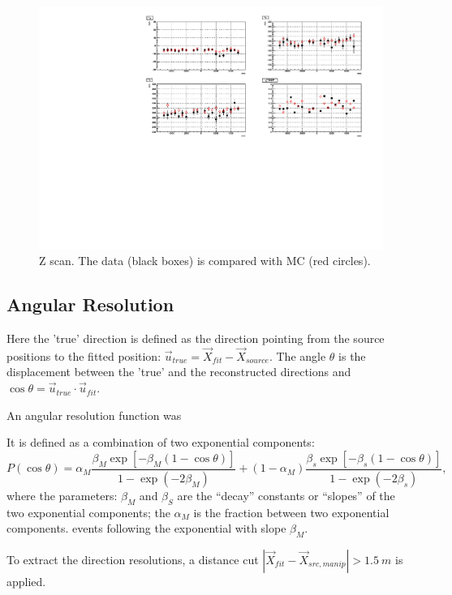 \begin{figure}
	\centering
	\includegraphics[width=15cm]{MPW_N16_zscanResol_itrCut.pdf}
	\caption{Z scan. The data (black boxes) is compared with MC (red circles).}
\label{MPWscanZResol}
\end{figure}

\subsection{Angular Resolution}


Here the 'true' direction is defined as the direction pointing from the source positions to the fitted position: $\vec{u}_{true} = \vec{X}_{fit}-\vec{X}_{source}$. The angle $\theta$ is the displacement between the 'true' and the reconstructed directions and $\cos\theta=\vec{u}_{true}\cdot \vec{u}_{fit}$.

An angular resolution function was 

It is defined as a combination of two exponential components:
\begin{equation}
P(\cos\theta)=\alpha_M\frac{\beta_M\exp[-\beta_M(1-\cos\theta)]}{1-\exp(-2\beta_M)}+(1-\alpha_M)\frac{\beta_s\exp[-\beta_s(1-\cos\theta)]}{1-\exp(-2\beta_s)},
\end{equation}
where the parameters: $\beta_M$ and $\beta_S$ are the ``decay'' constants or ``slopes'' of the two exponential components; the $\alpha_M$ is the fraction between two exponential components.
events following the exponential with slope $\beta_M$. 

To extract the direction resolutions, a distance cut $|\vec{X}_{fit}-\vec{X}_{src,manip}|>1.5~m$ is applied.

